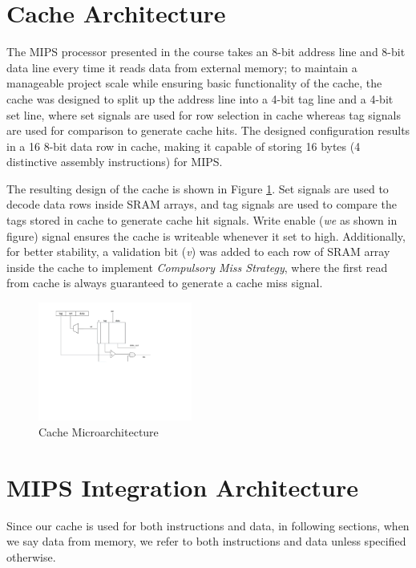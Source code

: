 \documentclass[conference]{IEEEtran}
\begin{document}
\section{Cache Architecture}\label{cache_arch}
The MIPS processor presented in the course takes an 8-bit address line and 8-bit data line every time it reads data from external memory; to maintain a manageable project scale while ensuring basic functionality of the cache, the cache was designed to split up the address line into a 4-bit tag line and a 4-bit set line, where set signals are used for row selection in cache whereas tag signals are used for comparison to generate cache hits. The designed configuration results in a 16 8-bit data row in cache, making it capable of storing 16 bytes (4 distinctive assembly instructions) for MIPS.

The resulting design of the cache is shown in Figure \ref{fig:cache_arch}. Set signals are used to decode data rows inside SRAM arrays, and tag signals are used to compare the tags stored in cache to generate cache hit signals. Write enable (\textit{we} as shown in figure) signal ensures the cache is writeable whenever it set to high. Additionally, for better stability, a validation bit (\textit{v}) was added to each row of SRAM array inside the cache to implement \textit{Compulsory Miss Strategy}, where the first read from cache is always guaranteed to generate a cache miss signal.

\begin{figure}[h!]
  \centering
    \includegraphics[width=0.45\textwidth]{cache_arch}
  \caption{Cache Microarchitecture}
  \label{fig:cache_arch}
\end{figure}

\section{MIPS Integration Architecture}\label{arch}
Since our cache is used for both instructions and data, in following sections,
	  when we say data from memory, we refer to both instructions and data unless specified
	  otherwise.
	  
\end{document}
